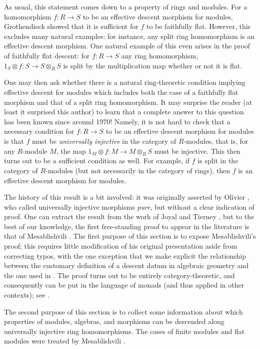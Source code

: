 \medskip\noindent
As usual, this statement comes down to a property of rings and modules.
For a homomorphism $f: R \to S$ to be an effective descent morphism for
modules, Grothendieck showed that it is sufficient for $f$ to be
faithfully flat. However, this excludes many natural examples: for instance,
any split ring homomorphism is an effective descent morphism. One natural
example of this even arises in the proof of faithfully flat descent: for
$f: R \to S$ any ring homomorphism, $1_S \otimes f: S \to S \otimes_R S$
is split by the multiplication map whether or not it is flat.

\medskip\noindent
One may then ask whether there is a natural ring-theoretic condition 
implying effective descent for modules which includes both the case of a
faithfully flat morphism and that of a split ring homomorphism. It may
surprise the reader (at least it surprised this author) to learn that a
complete answer to this question has been known since around 1970! Namely,
it is not hard to check that a necessary condition for $f: R \to S$ to be
an effective descent morphism for modules is that $f$ must be
{\it universally injective} in the category of $R$-modules, that is, for
any $R$-module $M$, the map $1_M  \otimes f: M \to M \otimes_R S$
must be injective. This then turns out to be a sufficient condition as well.
For example, if $f$ is split in the category of $R$-modules (but not
necessarily in the category of rings), then $f$ is an effective descent
morphism for modules.
 
\medskip\noindent
The history of this result is a bit involved: it was originally asserted
by Olivier \cite{olivier}, who  called universally injective morphisms
{\it pure}, but without a clear indication of proof. One can extract the
result from the work of Joyal and Tierney \cite{joyal-tierney}, but to the
best of our knowledge, the first free-standing proof to appear in the
literature is that of Mesablishvili \cite{mesablishvili1}. The first purpose
of this section is to expose Mesablishvili's proof; this requires little
modification of his original presentation aside from correcting typos, with
the one exception that we make explicit the relationship between the
customary definition of a descent datum in algebraic geometry and the one
used in \cite{mesablishvili1}. The proof turns out to be entirely
category-theoretic, and consequently can be put in the language of monads
(and thus applied in other contexts); see \cite{janelidze-tholen}.

\medskip\noindent
The second purpose of this section is to collect some information about which 
properties of modules, algebras, and morphisms can be descended along 
universally injective ring homomorphisms. The cases of finite modules
and flat modules were treated by Mesablishvili \cite{mesablishvili2}.


